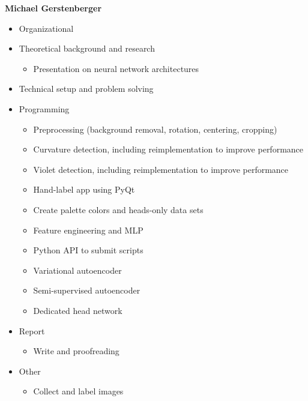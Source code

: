 \bigskip
\textbf{Michael Gerstenberger}
\begin{itemize}
	\item Organizational
	\item Theoretical background and research
	\begin{itemize}
		\item Presentation on neural network architectures
	\end{itemize}
	\item Technical setup and problem solving
	\item Programming
	\begin{itemize}
		\item Preprocessing (background removal, rotation, centering, cropping)
		\item Curvature detection, including reimplementation to improve performance
		\item Violet detection, including reimplementation to improve performance
		\item Hand-label app using PyQt
		\item Create palette colors and heads-only data sets
		\item Feature engineering and MLP
		\item Python API to submit scripts
		\item Variational autoencoder
		\item Semi-supervised autoencoder
		\item Dedicated head network
	\end{itemize}
	\item Report
	\begin{itemize}
		\item Write and proofreading
	\end{itemize}
	\item Other
	\begin{itemize}
		\item Collect and label images
	\end{itemize}
\end{itemize} 

